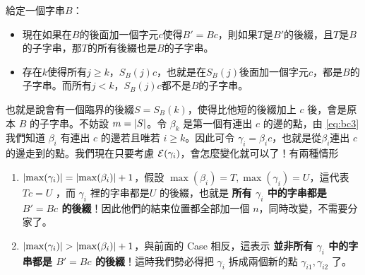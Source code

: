 \documentclass[a4paper,12pt]{book}
\begin{document}
\begin{theorem}[定理]
  給定一個字串$B$：%
  \begin{itemize}
    \item 現在如果在$B$的後面加一個字元$c$使得$B' = Bc$，則如果$T$是$B'$的後綴，且$T$是$B$的子字串，那$T$的所有後綴也是$B$的子字串。     
    \item 存在$k$使得所有$j \geq k$，$S_B(j) c$，也就是在$S_B(j)$後面加一個字元$c$，都是$B$的子字串。而所有$j < k$，$S_B(j) c$都不是$B$的子字串。\listeqn \label{eq:bc3}
  \end{itemize}
\end{theorem}
也就是說會有一個臨界的後綴$S = S_B(k)$，使得比他短的後綴加上 $c$ 後，會是原本 $B$ 的子字串。不妨設 $m = \lvert S \rvert$。令 $\beta_k$ 是第一個有連出 $c$ 的邊的點，由 \eqref{eq:bc3} 我們知道 $\beta_i$ 有連出 $c$ 的邊若且唯若 $i \geq k$。因此可令 $\gamma_i = \beta_i c$，也就是從$\beta_i$連出 $c$ 的邊走到的點。我們現在只要考慮 $\operatorname{\mathcal{E}}(\gamma_i)$，會怎麼變化就可以了！有兩種情形


\begin{enumerate}[label=Case \arabic*. ]
  \item $\lvert \max(\gamma_i) \rvert = \lvert \max(\beta_i) \rvert + 1$，假設 $\max(\beta_i) = T, \max(\gamma_i) = U$，這代表 $Tc = U$ ，而 $\gamma_i$ 裡的字串都是$U$ 的後綴，也就是 {\bf 所有 $\gamma_i$ 中的字串都是 $B' = Bc$ 的後綴}！因此他們的結束位置都全部加一個 $n$，同時改變，不需要分家了。
  \item $\lvert \max(\gamma_i) \rvert > \lvert \max(\beta_i) \rvert + 1$，與前面的 Case 相反，這表示 {\bf 並非所有 $\gamma_i$ 中的字串都是 $B' = Bc$ 的後綴}！這時我們勢必得把 $\gamma_i$ 拆成兩個新的點 $\gamma_{i1}, \gamma_{i2}$ 了。
\end{enumerate}
\end{document}
